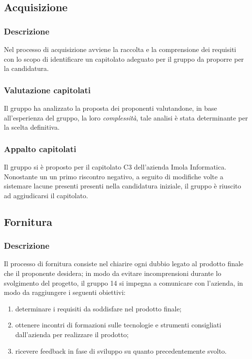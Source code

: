 \subsection{Acquisizione}
\subsubsection{Descrizione}
Nel processo di acquisizione avviene la raccolta e la comprensione dei requisiti con lo scopo di identificare un capitolato adeguato per il gruppo da proporre per la candidatura.
\subsubsection{Valutazione capitolati}
Il gruppo ha analizzato la proposta dei proponenti valutandone, in base all'esperienza del gruppo, la loro \textit{complessità}, tale analisi è stata determinante per la scelta definitiva.
\subsubsection{Appalto capitolati}
Il gruppo si è proposto per il capitolato C3 dell'azienda Imola Informatica. Nonostante un  un primo riscontro negativo, a seguito di modifiche volte a sistemare lacune presenti  presenti nella candidatura iniziale, il gruppo è riuscito ad aggiudicarsi il capitolato.

\subsection{Fornitura}
\subsubsection{Descrizione}
Il processo di fornitura consiste nel chiarire ogni dubbio legato al prodotto finale che il proponente desidera; in modo da evitare incomprensioni durante lo svolgimento del progetto, il gruppo 14 si impegna a comunicare con l'azienda, in modo da raggiungere i seguenti obiettivi:
\begin{enumerate}
    \item determinare i requisiti da soddisfare nel prodotto finale;
    \item ottenere incontri di formazioni sulle tecnologie e strumenti consigliati dall'azienda per realizzare il prodotto;
    \item ricevere feedback in fase di sviluppo su quanto precedentemente svolto.
\end{enumerate}

